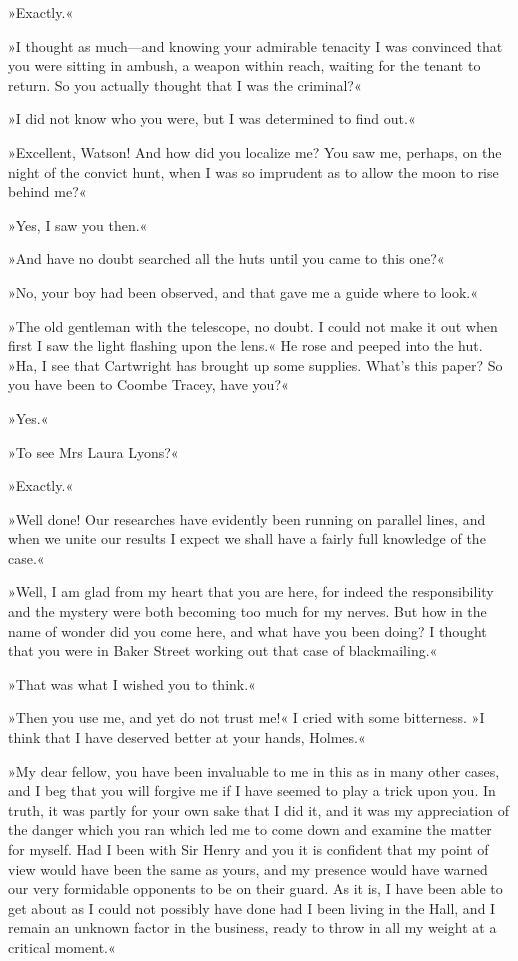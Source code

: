 »Exactly.«

»I thought as much—and knowing your admirable tenacity I was convinced that you were sitting in ambush, a weapon within reach, waiting for the tenant to return. So you actually thought that I was the criminal?«

»I did not know who you were, but I was determined to find out.«

»Excellent, Watson! And how did you localize me? You saw me, perhaps, on the night of the convict hunt, when I was so imprudent as to allow the moon to rise behind me?«

»Yes, I saw you then.«

»And have no doubt searched all the huts until you came to this one?«

»No, your boy had been observed, and that gave me a guide where to look.«

»The old gentleman with the telescope, no doubt. I could not make it out when first I saw the light flashing upon the lens.« He rose and peeped into the hut. »Ha, I see that Cartwright has brought up some supplies. What's this paper? So you have been to Coombe Tracey, have you?«

»Yes.«

»To see Mrs Laura Lyons?«

»Exactly.«

»Well done! Our researches have evidently been running on parallel lines, and when we unite our results I expect we shall have a fairly full knowledge of the case.«

»Well, I am glad from my heart that you are here, for indeed the responsibility and the mystery were both becoming too much for my nerves. But how in the name of wonder did you come here, and what have you been doing? I thought that you were in Baker Street working out that case of blackmailing.«

»That was what I wished you to think.«

»Then you use me, and yet do not trust me!« I cried with some bitterness. »I think that I have deserved better at your hands, Holmes.«

»My dear fellow, you have been invaluable to me in this as in many other cases, and I beg that you will forgive me if I have seemed to play a trick upon you. In truth, it was partly for your own sake that I did it, and it was my appreciation of the danger which you ran which led me to come down and examine the matter for myself. Had I been with Sir Henry and you it is confident that my point of view would have been the same as yours, and my presence would have warned our very formidable opponents to be on their guard. As it is, I have been able to get about as I could not possibly have done had I been living in the Hall, and I remain an unknown factor in the business, ready to throw in all my weight at a critical moment.«

